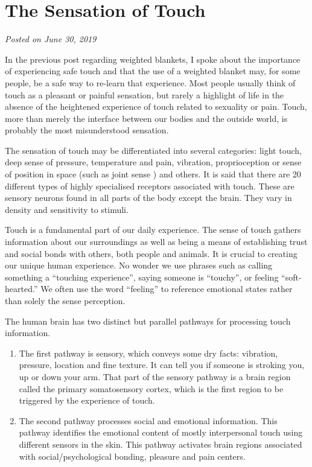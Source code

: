 \documentclass[]{book}
\begin{document}
\hypertarget{the-sensation-of-touch}{%
\section{The Sensation of Touch}\label{the-sensation-of-touch}}

\emph{Posted on June 30, 2019}

In the previous post regarding weighted blankets, I spoke about the importance of experiencing safe touch and that the use of a weighted blanket may, for some people, be a safe way to re-learn that experience. Most people usually think of touch as a pleasant or painful sensation, but rarely a highlight of life in the absence of the heightened experience of touch related to sexuality or pain. Touch, more than merely the interface between our bodies and the outside world, is probably the most misunderstood sensation.

The sensation of touch may be differentiated into several categories: light touch, deep sense of pressure, temperature and pain, vibration, proprioception or sense of position in space (such as joint sense ) and others. It is said that there are 20 different types of highly specialised receptors associated with touch. These are sensory neurons found in all parts of the body except the brain. They vary in density and sensitivity to stimuli.

Touch is a fundamental part of our daily experience. The sense of touch gathers information about our surroundings as well as being a means of establishing trust and social bonds with others, both people and animals. It is crucial to creating our unique human experience. No wonder we use phrases such as calling something a ``touching experience'', saying someone is ``touchy'', or feeling ``soft-hearted.'' We often use the word ``feeling'' to reference emotional states rather than solely the sense perception.

The human brain has two distinct but parallel pathways for processing touch information.

\begin{enumerate}
\def\labelenumi{\arabic{enumi}.}
\item
  The first pathway is sensory, which conveys some dry facts: vibration, pressure, location and fine texture. It can tell you if someone is stroking you, up or down your arm. That part of the sensory pathway is a brain region called the primary somatosensory cortex, which is the first region to be triggered by the experience of touch.
\item
  The second pathway processes social and emotional information. This pathway identifies the emotional content of mostly interpersonal touch using different sensors in the skin. This pathway activates brain regions associated with social/psychological bonding, pleasure and pain centers.
\end{enumerate}
\end{document}
